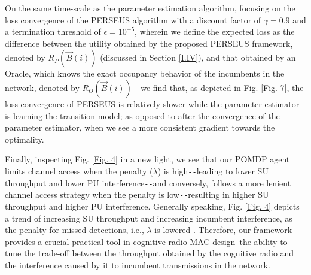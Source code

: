 \documentclass[12pt, draftcls, onecolumn]{IEEEtran}
\begin{document}
On the same time-scale as the parameter estimation algorithm, focusing on the loss convergence of the PERSEUS algorithm with a discount factor of $\gamma{=}0.9$ and a termination threshold of $\epsilon{=}10^{-5}$, wherein we define the expected loss as the difference between the utility obtained by the proposed PERSEUS framework, denoted by $R_{P}(\vec{B}(i))$ (discussed in Section \ref{I.IV}), and that obtained by an Oracle, which knows the exact occupancy behavior of the incumbents in the network, denoted by $R_{O}(\vec{B}(i))$\texttt{-{}-}we find that, as depicted in Fig. \ref{Fig. 7}, the loss convergence of PERSEUS is relatively slower while the parameter estimator is learning the transition model; as opposed to after the convergence of the parameter estimator, when we see a more consistent gradient towards the optimality.

Finally, inspecting Fig. \ref{Fig. 4} in a new light, we see that our POMDP agent limits channel access when the penalty ($\lambda$) is high\texttt{-{}-}leading to lower SU throughput and lower PU interference\texttt{-{}-}and conversely, follows a more lenient channel access strategy when the penalty is low\texttt{-{}-}resulting in higher SU throughput and higher PU interference. Generally speaking, Fig. \ref{Fig. 4} depicts a trend of increasing SU throughput and increasing incumbent interference, as the penalty for missed detections, i.e., $\lambda$ is lowered \cite{WCL:paper}. Therefore, our framework provides a crucial practical tool in cognitive radio MAC design\texttt{-}the ability to tune the trade-off between the throughput obtained by the cognitive radio and the interference caused by it to incumbent transmissions in the network.
\end{document}
